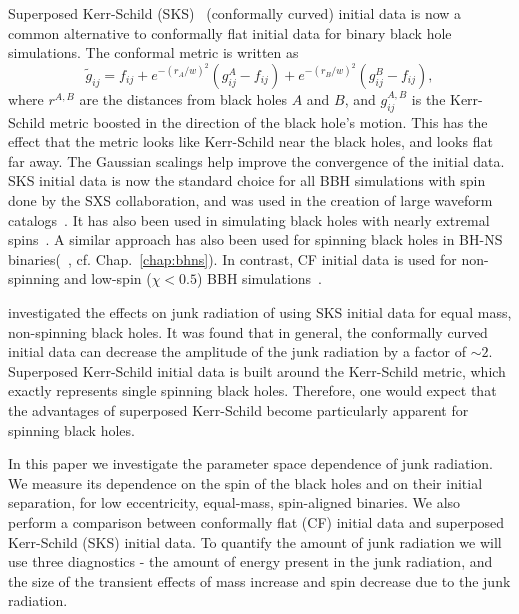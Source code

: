 Superposed Kerr-Schild (SKS)~\citep{Matzner1999,Marronetti-Matzner:2000,Pfeiffer2002a,Lovelace2008} (conformally curved) initial data is now a common alternative to conformally flat initial data for binary black hole simulations.
The conformal metric is written as
\begin{equation}
\tilde{g}_{ij}=f_{ij}+e^{-(r_A/w)^2}\left(g_{ij}^A-f_{ij}\right)+e^{-(r_B/w)^2}\left(g_{ij}^B-f_{ij}\right),
\end{equation}
where $r^{A,B}$ are the distances
from black holes $A$ and $B$, and $g_{ij}^{A,B}$ is the Kerr-Schild metric boosted in
the direction of the black hole's motion. This has the effect that the
metric looks like Kerr-Schild near the black holes, and looks flat
far away. The Gaussian scalings help improve the
convergence of the initial data. SKS initial data is now the standard choice for all BBH simulations with spin done by the SXS collaboration, and was used in the creation of large waveform catalogs~\citep{Mroue:2013PRL,Chu:2015kft}. It has also been used in simulating black holes with nearly extremal spins~\citep{Lovelace:2011nu,Scheel2014,Lovelace:2014twa}. A similar approach has also been used for spinning black holes in BH-NS binaries(~\cite{FoucartEtAl:2008}, cf. Chap.~\ref{chap:bhns}). In contrast, CF initial data is used for non-spinning and low-spin ($\chi<0.5$) BBH simulations~\citep{Boyle2007,Buchman:2012dw,Chu:2015kft}.

\cite{Lovelace2009} investigated the effects on junk radiation of using SKS initial data for equal mass, non-spinning black
holes. It was found that in general, the
conformally curved initial data can decrease the amplitude of the junk
radiation by a factor of $\sim 2$.
Superposed Kerr-Schild initial data is built around the
  Kerr-Schild metric, which exactly represents single spinning black holes.
 Therefore, one would expect that the advantages of superposed Kerr-Schild become particularly apparent for spinning black holes.

In this paper we investigate the parameter space dependence of junk
radiation. We measure its dependence on the spin of the black holes and on their initial
separation, for low eccentricity, equal-mass,
spin-aligned binaries. We also perform a comparison between conformally
flat (CF) initial data and superposed Kerr-Schild (SKS) initial data. To
quantify the amount of junk radiation we will use three
diagnostics - the amount of energy present in the junk radiation, and
the size of the transient effects of mass increase and spin decrease
due to the junk radiation.

